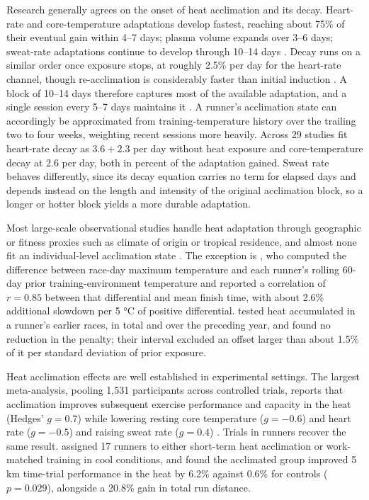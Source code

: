 \documentclass[11pt]{article}
\renewcommand{\_}{\textunderscore\allowbreak}
\begin{document}
Research generally agrees on the onset of heat acclimation and its decay. Heart-rate and core-temperature adaptations develop fastest, reaching about 75\% of their eventual gain within 4--7 days; plasma volume expands over 3--6 days; sweat-rate adaptations continue to develop through 10--14 days \citep{periard2015, tyler2016, racinais2020, chalmers2014, cubel2024}. Decay runs on a similar order once exposure stops, at roughly 2.5\% per day for the heart-rate channel, though re-acclimation is considerably faster than initial induction \citep{daanen2018, racinais2020, pryor2019}. A block of 10--14 days therefore captures most of the available adaptation, and a single session every 5--7 days maintains it \citep{daanen2018, garrett2011}. A runner's acclimation state can accordingly be approximated from training-temperature history over the trailing two to four weeks, weighting recent sessions more heavily. Across 29 studies \citet{daanen2018} fit heart-rate decay as $3.6 + 2.3$ per day without heat exposure and core-temperature decay at $2.6$ per day, both in percent of the adaptation gained. Sweat rate behaves differently, since its decay equation carries no term for elapsed days and depends instead on the length and intensity of the original acclimation block, so a longer or hotter block yields a more durable adaptation.

Most large-scale observational studies handle heat adaptation through geographic or fitness proxies such as climate of origin or tropical residence, and almost none fit an individual-level acclimation state \citep{ioannou2018, scheer2021, knechtle2021a, tan2022}. The exception is \citet{vernon2021}, who computed the difference between race-day maximum temperature and each runner's rolling 60-day prior training-environment temperature and reported a correlation of $r = 0.85$ between that differential and mean finish time, with about 2.6\% additional slowdown per 5 °C of positive differential. \citet{oliveira2026} tested heat accumulated in a runner's earlier races, in total and over the preceding year, and found no reduction in the penalty; their interval excluded an offset larger than about 1.5\% of it per standard deviation of prior exposure.

Heat acclimation effects are well established in experimental settings. The largest meta-analysis, pooling 1{,}531 participants across controlled trials, reports that acclimation improves subsequent exercise performance and capacity in the heat (Hedges' $g = 0.7$) while lowering resting core temperature ($g = -0.6$) and heart rate ($g = -0.5$) and raising sweat rate ($g = 0.4$) \citep{tyler2024}. Trials in runners recover the same result. \citet{james2017} assigned 17 runners to either short-term heat acclimation or work-matched training in cool conditions, and found the acclimated group improved 5\,km time-trial performance in the heat by 6.2\% against 0.6\% for controls ($p = 0.029$), alongside a 20.8\% gain in total run distance. 
\end{document}
